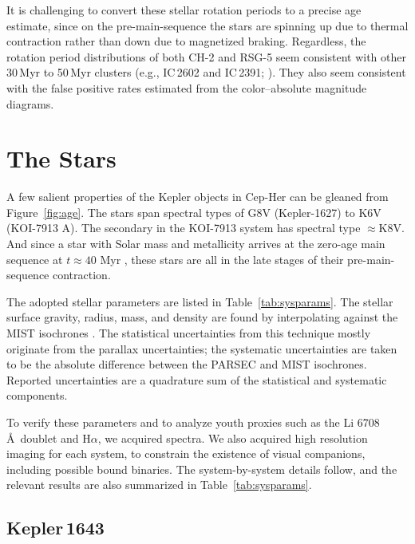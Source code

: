 \documentclass[12pt,twocolumn]{aastex63}
\begin{document}
It is challenging to convert these stellar rotation periods to a
precise age estimate, since on the pre-main-sequence the stars are
spinning up due to thermal contraction rather than down due to
magnetized braking.  Regardless, the rotation period distributions of
both CH-2 and RSG-5 seem consistent with other 30\,Myr to 50\,Myr
clusters ({e.g.}, IC\,2602 and IC\,2391;
\citealt{douglas_stephanie_t_2021_5131306}).  They also seem
consistent with the false positive rates estimated from the
color--absolute magnitude diagrams.


\section{The Stars}
\label{sec:stars}



A few salient properties of the Kepler objects in Cep-Her can be
gleaned from Figure~\ref{fig:age}.  The stars span spectral types of
G8V (Kepler-1627) to K6V (KOI-7913 A).  The secondary in the KOI-7913
system has spectral type $\approx$K8V.  And since a star with
Solar mass and metallicity arrives at the zero-age main sequence at
$t\approx40$ Myr \citep{choi_mesa_2016}, these stars are all in the
late stages of their pre-main-sequence contraction.  

The adopted stellar parameters are listed in
Table~\ref{tab:sysparams}.  The stellar surface gravity, radius, mass,
and density are found by interpolating against the MIST isochrones
\citep{choi_mesa_2016}.  The statistical uncertainties from this
technique mostly originate from the parallax uncertainties; the
systematic uncertainties are taken to be the absolute difference
between the PARSEC \citep{bressan_parsec_2012} and MIST isochrones.
Reported uncertainties are a quadrature sum of the statistical and
systematic components. 

To verify these parameters and to analyze youth
proxies such as the Li 6708\,\AA\ doublet and H$\alpha$, we acquired
spectra.  We also acquired high resolution imaging for each system, to
constrain the existence of visual companions, including possible bound
binaries.  The system-by-system details follow, and the relevant
results are also summarized in Table~\ref{tab:sysparams}.

\subsection{Kepler\,1643}
\end{document}
